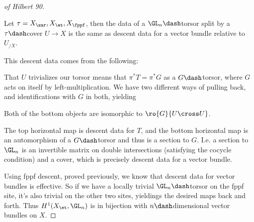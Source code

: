 \begin{proof}[of Hilbert 90]

\begin{observation}

Let \(\tau = X_{\zar}, X_\et, X_{\fppf}\), then the data of a
\(\GL_n\dash\)torsor split by a \(\tau\dash\)cover \(U\to X\) is the
same as descent data for a vector bundle relative to \(U_{/X}\).

\end{observation}

\vspace{2em}

This descent data comes from the following:

\begin{center}
\end{center}

That \(U\) trivializes our torsor means that \(\pi^* T = \pi^* G\) as a
\(G\dash\)torsor, where \(G\) acts on itself by left-multiplication. We
have two different ways of pulling back, and identifications with \(G\)
in both, yielding

\begin{center}
\end{center}

Both of the bottom objects are isomorphic to \(\ro{G}{U\cross U}\).

\begin{claim}

The top horizontal map is descent data for \(T\), and the bottom
horizontal map is an automorphism of a \(G\dash\)torsor and thus is a
section to \(G\). I.e. a section to \(\GL_n\) is an invertible matrix on
double intersections (satisfying the cocycle condition) and a cover,
which is precisely descent data for a vector bundle.

\end{claim}

Using fppf descent, proved previously, we know that descent data for
vector bundles is effective. So if we have a locally trivial
\(\GL_n\dash\)torsor on the fppf site, it's also trivial on the other
two sites, yieldings the desired maps back and forth. Thus
\(H^1(X_\et, \GL_n)\) is in bijection with \(n\dash\)dimensional vector
bundles on \(X\).

\end{proof}

